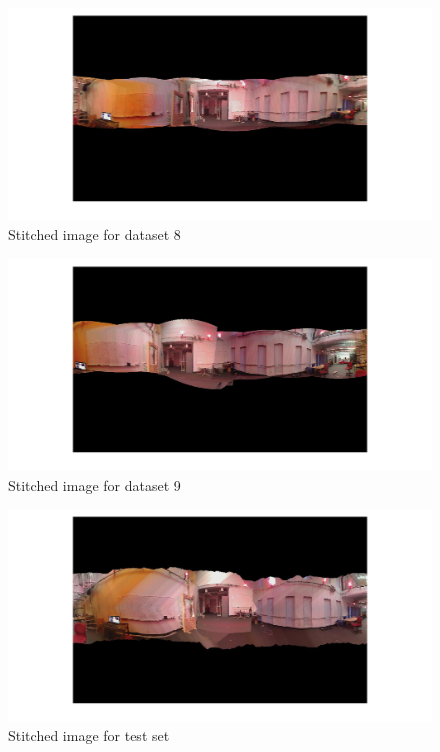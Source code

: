 \documentclass[fleqn,10pt]{SelfArx} %
\begin{document}
\begin{figure}
\centering
\includegraphics[trim={10cm 0cm 10cm 0cm},scale = 0.35]{pan8.jpg}
\caption{Stitched image for dataset 8}
\label{fig:pan8}
\end{figure}

\begin{figure}
\centering
\includegraphics[trim={10cm 0cm 10cm 0cm},width=\textwidth]{pan9.jpg}
\caption{Stitched image for dataset 9}
\label{fig:pan9}
\end{figure}

\begin{figure}
\centering
\includegraphics[trim={10cm 0cm 10cm 0cm},width=\textwidth]{pan10.jpg}
\caption{Stitched image for test set}
\label{fig:pan10}
\end{figure}
\end{document}
